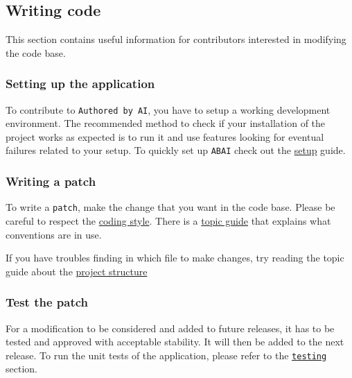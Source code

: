 \label{sec:contributors-reference}
\subsection{Writing code}
This section contains useful information for contributors interested in modifying the code base.

\subsubsection{Setting up the application}
To contribute to \texttt{Authored by AI}, you have to setup a working development environment. The recommended method to check if your installation of the project works as expected is to run it and use features looking for eventual failures related to your setup. To quickly set up \texttt{ABAI} check out the \hyperref[subsec:setup]{setup} guide.

\subsubsection{Writing a patch}
To write a \texttt{patch}, make the change that you want in the code base. Please be careful to respect the \hyperref[subsubsec:coding-style]{coding style}. There is a \hyperref[subsec:topic-guide]{topic guide} that explains what conventions are in use.\\

\begin{tcolorbox}[colback=blue!10!white,colframe=blue!70!black,title=Note]
If you have troubles finding in which file to make changes, try reading the topic guide about the \hyperref[subsubsec:project-structure]{project structure}
\end{tcolorbox}

\subsubsection{Test the patch}
For a modification to be considered and added to future releases, it has to be tested and approved with acceptable stability. It will then be added to the next release. To run the unit tests of the application, please refer to the \hyperref[subsec:testing]{\texttt{testing}} section.
